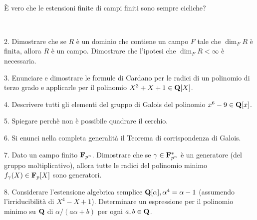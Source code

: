 \ \dotfill\ \bigskip\bigskip\bigskip\vfil

 \`E vero che le estensioni finite di campi finiti sono sempre cicliche?\medskip\bigskip\bigskip

\ \dotfill\ \bigskip\bigskip\bigskip

\vfil\eject


\item{2.} Dimostrare che se $R$ \`e un dominio che contiene un campo $F$ tale che $\dim_FR$ \`e
finita, allora $R$ \`e un campo. Dimostrare che l'ipotesi che $\dim_FR<\infty$ \`e necessaria.

\vv


\item{3.} Enunciare e dimostrare le formule di Cardano per le radici di un polinomio di terzo grado e applicarle per il
polinomio $X^3+X+1\in{\bf Q}[X]$.
\ve\ \vs


\item{4.} Descrivere tutti gli elementi del gruppo di Galois del polinomio $x^6-9\in{\bf Q}[x]$. \vv

\item{5.} Spiegare perch\`e non \`e possibile quadrare il cerchio.
\ve\ \vs


\item{6.} Si enunci nella completa generalit\`a il Teorema di
corrispondenza di Galois.\vskip 6cm\bigskip\bigskip\bigskip\vv\vv


\item{7.} Dato un campo finito ${\bf F}_{p^n}$. Dimostrare che se $\gamma\in{\bf F}_{p^n}^*$
\`e un generatore (del gruppo moltiplicativo), allora tutte le radici del polinomio minimo $f_\gamma(X)\in{\bf F}_p[X]$
sono generatori.\vskip 6cm\bigskip\bigskip\bigskip\vv\vv

\item{8.} Considerare l'estensione algebrica semplice ${\bf Q}[\alpha], \alpha^4=\alpha-1$ (assumendo l'irriducibilit\`a di $X^4-X+1$). 
Determinare un espressione per il polinomio minimo su ${\bf Q}$ di $\alpha/(a\alpha+b)$ per ogni $a,b\in{\bf Q}$.


\vv

\ \vst
 \bye
